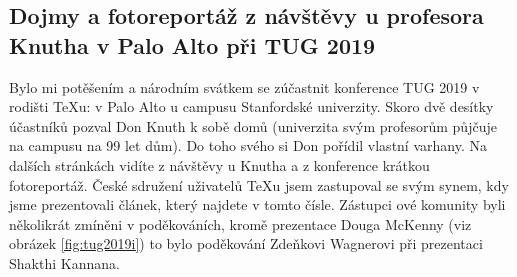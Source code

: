 \subsection*{Dojmy a fotoreportáž z návštěvy u profesora Knutha v Palo Alto při TUG 2019}
Bylo mi potěšením a národním svátkem se zúčastnit konference TUG 2019 v rodišti \TeX u: v Palo Alto u campusu Stanfordské univerzity. Skoro dvě desítky účastníků pozval Don Knuth k sobě domů (univerzita svým profesorům půjčuje na campusu na 99 let dům). Do toho svého si Don pořídil vlastní varhany. Na dalších stránkách vidíte z návštěvy u Knutha a z konference krátkou fotoreportáž.
České sdružení uživatelů \TeX u jsem zastupoval se svým synem, kdy jsme prezentovali článek, který najdete v tomto čísle.  Zástupci \CSTUG ové komunity byli několikrát zmíněni v poděkováních, kromě prezentace Douga McKenny (viz obrázek \ref{fig:tug2019i}) to bylo poděkování Zdeňkovi Wagnerovi při prezentaci Shakthi Kannana.
